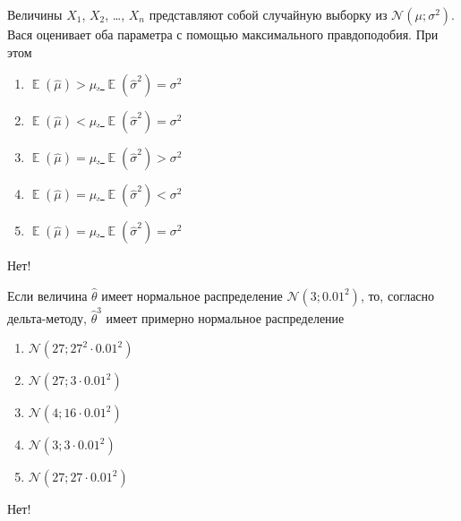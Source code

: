 \documentclass[t]{beamer}
\DeclareMathOperator{\E}{\mathbb{E}}
\newcommand{\cN}{\mathcal{N}}
\begin{document}
 \begin{frame} \label{18-No} 
\begin{block}{18} 

  Величины $X_1$, $X_2$, \ldots, $X_n$ представляют собой случайную выборку из $\cN(\mu; \sigma^2)$. Вася оценивает оба параметра с помощью максимального правдоподобия. При этом


 \end{block} 
\begin{enumerate} 
\item[] \hyperlink{18-No}{\beamergotobutton{} $\E(\hat \mu)>\mu$, $\E(\hat\sigma^2) = \sigma^2$}
\item[] \hyperlink{18-No}{\beamergotobutton{} $\E(\hat \mu)<\mu$, $\E(\hat\sigma^2) = \sigma^2$}
\item[] \hyperlink{18-No}{\beamergotobutton{} $\E(\hat \mu)=\mu$, $\E(\hat\sigma^2) > \sigma^2$}
\item[] \hyperlink{18-Yes}{\beamergotobutton{} $\E(\hat \mu)=\mu$, $\E(\hat\sigma^2) < \sigma^2$}
\item[] \hyperlink{18-No}{\beamergotobutton{} $\E(\hat \mu)=\mu$, $\E(\hat\sigma^2) = \sigma^2$}
\end{enumerate} 

 \alert{Нет!} 
\end{frame} 


 \begin{frame} \label{19-No} 
\begin{block}{19} 

    Если величина $\hat\theta$ имеет нормальное распределение $\cN(3;0.01^2)$, то, согласно дельта-методу, $\hat\theta^3$ имеет примерно нормальное распределение
    

 \end{block} 
\begin{enumerate} 
\item[] \hyperlink{19-Yes}{\beamergotobutton{} $\cN(27;27^2\cdot 0.01^2)$}
\item[] \hyperlink{19-No}{\beamergotobutton{} $\cN(27;3\cdot 0.01^2)$}
\item[] \hyperlink{19-No}{\beamergotobutton{} $\cN(4;16\cdot 0.01^2)$}
\item[] \hyperlink{19-No}{\beamergotobutton{} $\cN(3;3\cdot 0.01^2)$}
\item[] \hyperlink{19-No}{\beamergotobutton{} $\cN(27;27\cdot 0.01^2)$}
\end{enumerate} 

 \alert{Нет!} 
\end{frame} 
\end{document}
